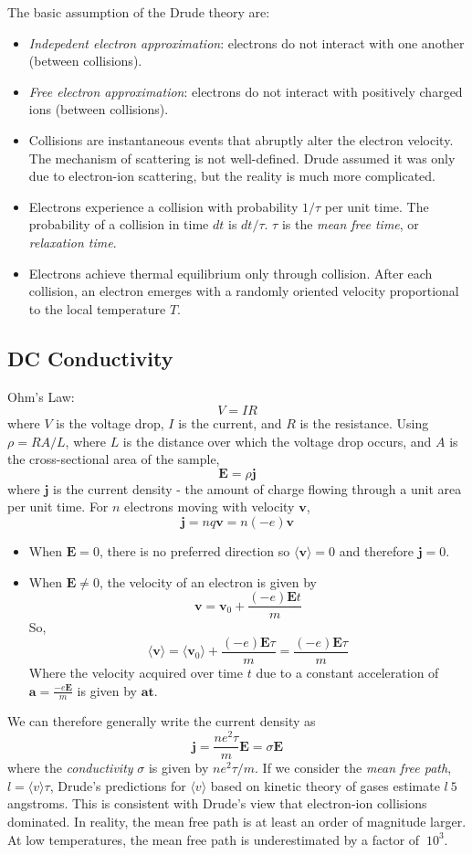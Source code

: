 \documentclass[10pt]{article}
\begin{document}
The basic assumption of the Drude theory are:
\begin{itemize}
  \item \emph{Indepedent electron approximation}: electrons do not interact with one another (between collisions).
  \item \emph{Free electron approximation}: electrons do not interact with positively charged ions (between collisions).
  \item Collisions are instantaneous events that abruptly alter the electron velocity. The mechanism of scattering is not
  well-defined. Drude assumed it was only due to electron-ion scattering, but the reality is much more complicated.
  \item Electrons experience a collision with probability $1/\tau$ per unit time. The probability of a collision in time $dt$
  is $dt/\tau$. $\tau$ is the \emph{mean free time}, or \emph{relaxation time}.
  \item Electrons achieve thermal equilibrium only through collision. After each collision, an electron emerges with a randomly oriented
  velocity proportional to the local temperature $T$.
\end{itemize}

\subsection{DC Conductivity}
Ohm's Law:
$$V = IR$$
where $V$ is the voltage drop, $I$ is the current, and $R$ is the resistance. Using $\rho = RA/L$, where $L$ is the
distance over which the voltage drop occurs, and $A$ is the cross-sectional area of the sample,
$$\textbf{E} = \rho \textbf{j} $$
where $\textbf{j}$ is the current density - the amount of charge flowing through a unit area per unit time.
For $n$ electrons moving with velocity $\textbf{v}$,
$$
\textbf{j} = nq\textbf{v} = n(-e)\textbf{v}
$$
\begin{itemize}
  \item When $\textbf{E} = 0$, there is no preferred direction so $\langle \textbf{v} \rangle = 0$ and therefore $\textbf{j} = 0$.
  \item When $\textbf{E} \neq 0$, the velocity of an electron is given by
  $$ \textbf{v} = \textbf{v}_{0} + \frac{(-e)\textbf{E}t}{m}$$
  So,
  $$ \langle \textbf{v} \rangle = \langle \textbf{v}_{0} \rangle + \frac{(-e)\textbf{E}\tau}{m} = \frac{(-e)\textbf{E}\tau}{m} $$
  Where the velocity acquired over time $t$ due to a constant acceleration of $\textbf{a} = \frac{-e\textbf{E}}{m}$ is given by $\textbf{at}$.
\end{itemize}
We can therefore generally write the current density as
$$\textbf{j} = \frac{ne^{2}\tau}{m} \textbf{E}= \sigma \textbf{E} $$
where the \emph{conductivity} $\sigma$ is given by $ne^{2}\tau/m$.
If we consider the \emph{mean free path}, $l = \langle v\rangle \tau$, Drude's predictions for $\langle v\rangle$ based on kinetic theory
of gases estimate $l ~ 5 $angstroms. This is consistent with Drude's view that electron-ion collisions dominated. In reality, the mean free
path is at least an order of magnitude larger. At low temperatures, the mean free path is underestimated by a factor of $~10^{3}$.
\end{document}
